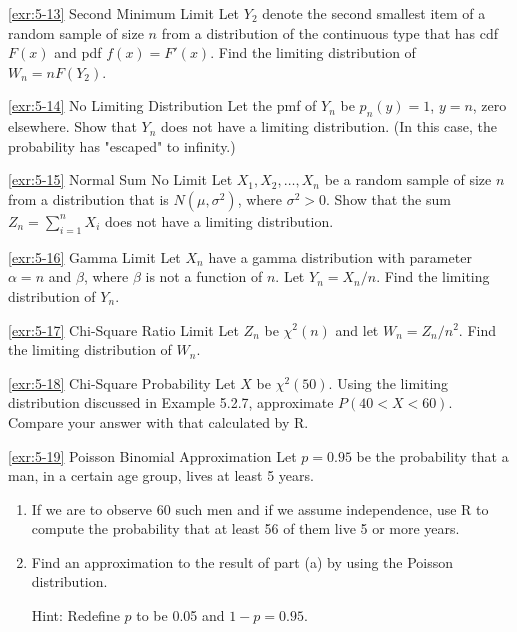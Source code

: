 \begin{exercise}{\ref{exr:5-13} Second Minimum Limit}\label{exr:5-13}
Let $Y_2$ denote the second smallest item of a random sample of size $n$ from a distribution of the continuous type that has cdf $F(x)$ and pdf $f(x) = F'(x)$. Find the limiting distribution of $W_n = nF(Y_2)$.
\end{exercise}

\begin{exercise}{\ref{exr:5-14} No Limiting Distribution}\label{exr:5-14}
Let the pmf of $Y_n$ be $p_n(y) = 1$, $y = n$, zero elsewhere. Show that $Y_n$ does not have a limiting distribution. (In this case, the probability has "escaped" to infinity.)
\end{exercise}

\begin{exercise}{\ref{exr:5-15} Normal Sum No Limit}\label{exr:5-15}
Let $X_1, X_2, \ldots, X_n$ be a random sample of size $n$ from a distribution that is $N(\mu, \sigma^2)$, where $\sigma^2 > 0$. Show that the sum $Z_n = \sum_{i=1}^n X_i$ does not have a limiting distribution.
\end{exercise}

\begin{exercise}{\ref{exr:5-16} Gamma Limit}\label{exr:5-16}
Let $X_n$ have a gamma distribution with parameter $\alpha = n$ and $\beta$, where $\beta$ is not a function of $n$. Let $Y_n = X_n/n$. Find the limiting distribution of $Y_n$.
\end{exercise}

\begin{exercise}{\ref{exr:5-17} Chi-Square Ratio Limit}\label{exr:5-17}
Let $Z_n$ be $\chi^2(n)$ and let $W_n = Z_n/n^2$. Find the limiting distribution of $W_n$.
\end{exercise}

\begin{exercise}{\ref{exr:5-18} Chi-Square Probability}\label{exr:5-18}
Let $X$ be $\chi^2(50)$. Using the limiting distribution discussed in Example 5.2.7, approximate $P(40 < X < 60)$. Compare your answer with that calculated by R.
\end{exercise}

\begin{exercise}{\ref{exr:5-19} Poisson Binomial Approximation}\label{exr:5-19}
Let $p = 0.95$ be the probability that a man, in a certain age group, lives at least 5 years.
\begin{enumerate}
\item[(a)] If we are to observe 60 such men and if we assume independence, use R to compute the probability that at least 56 of them live 5 or more years.
\item[(b)] Find an approximation to the result of part (a) by using the Poisson distribution.

Hint: Redefine $p$ to be 0.05 and $1-p = 0.95$.
\end{enumerate}
\end{exercise}

